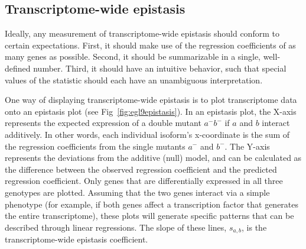 \documentclass[9pt,twocolumn,twoside,lineno]{pnas-new}
\newcommand{\gene}[1]{\emph{#1}}
\newcommand{\nhr}{\emph{\mbox{nhr-57}}}
\newcommand{\egl}{\emph{\mbox{egl-9}(lf)}}
\newcommand{\rhy}{\emph{\mbox{rhy-1}(lf)}}
\newcommand{\vhl}{\emph{\mbox{vhl-1}(lf)}}
\newcommand{\eglvhl}{\emph{\mbox{egl-9(lf);vhl-1(lf)}}}
\newcommand{\eglhif}{\emph{\mbox{egl-9(lf)}~\mbox{hif-1(lf)}}}
\newcommand{\hifp}{HIF-1}
\begin{document}
%


\subsection*{Transcriptome-wide epistasis}
Ideally, any measurement of transcriptome-wide epistasis should conform to certain
expectations. First, it should make use of the regression coefficients of as
many genes as possible. Second, it should be summarizable in a single,
well-defined number. Third, it should have an intuitive behavior, such that
special values of the statistic should each have an unambiguous interpretation.

One way of displaying transcriptome-wide epistasis is to plot transcriptome data
onto an epistasis plot (see Fig~\ref{fig:egl9epistasis}). In an epistasis plot,
the X-axis represents the expected expression of a double mutant $a^-b^-$ if $a$
and $b$ interact additively.
In other words, each individual isoform's x-coordinate is the sum of the
regression coefficients from the single mutants $a^-$ and $b^-$.
The Y-axis represents the deviations from the additive (null) model, and
can be calculated as the difference between the observed regression coefficient
and the predicted regression coefficient. Only genes that are differentially
expressed in all three genotypes are plotted. Assuming that the two genes interact
via a simple phenotype (for example, if both genes affect a transcription factor
that generates the entire transcriptome), these plots will generate specific
patterns that can be described through linear regressions. The slope of these
lines, $s_{a,b}$, is the transcriptome-wide epistasis coefficient.
\end{document}
